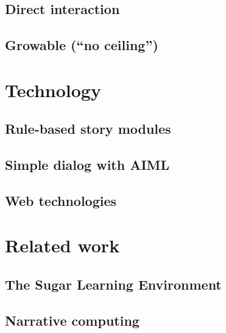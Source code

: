 \documentclass{acm_proc_article-sp}
\begin{document}
\subsection{Direct interaction}

\subsection{Growable (``no ceiling'')}


\section{Technology}
\subsection{Rule-based story modules}
\subsection{Simple dialog with AIML}
\subsection{Web technologies}

\section{Related work}\label{sec:related}
\cite{chang:tinkrbook}
\subsection{The Sugar Learning Environment}
\subsection{Narrative computing}
\end{document}
